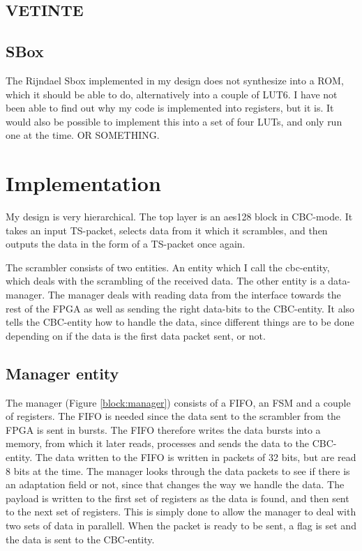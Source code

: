 \subsection{VETINTE}

\subsection{SBox}
The Rijndael Sbox implemented in my design does not synthesize into a 
ROM, which it should be able to do, alternatively into a couple of LUT6.
I have not been able to find out why my code is implemented into 
registers, but it is. 
It would also be possible to implement this into a set of four LUTs, 
and only run one at the time. OR SOMETHING.

\section{Implementation}
My design is very hierarchical. The top layer is an aes128 block in 
CBC-mode. It takes an input TS-packet, selects data from it which it 
scrambles, and then outputs the data in the form of a TS-packet once 
again.

The scrambler consists of two entities. An entity which I call the 
cbc-entity, which deals with the scrambling of the received data. The 
other entity is a data-manager. The manager deals with reading data 
from the interface towards the rest of the FPGA as well as sending the 
right data-bits to the CBC-entity. It also tells the CBC-entity how to 
handle the data, since different things are to be done depending on if 
the data is the first data packet sent, or not.

\subsection{Manager entity}
The manager (Figure \ref{block:manager}) consists of a FIFO, an FSM and 
a couple of registers. The FIFO is needed since the data sent to the 
scrambler from the FPGA is sent in bursts. The FIFO therefore writes 
the data bursts into a memory, from which it later reads, processes and 
sends the data to the CBC-entity. The data written to the FIFO is 
written in packets of 32 bits, but are read 8 bits at the time. The 
manager looks through the data packets to see if there is an adaptation 
field or not, since that changes the way we handle the data. The 
payload is written to the first set of registers as the data is found, 
and then sent to the next set of registers. This is simply done to 
allow the manager to deal with two sets of data in parallell. When the 
packet is ready to be sent, a flag is set and the data is sent to the 
CBC-entity. 

